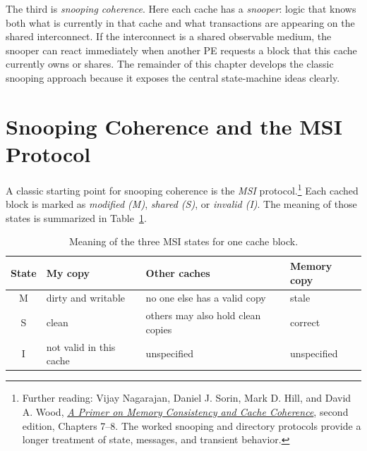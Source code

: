 The third is \textit{snooping coherence}.
Here each cache has a \textit{snooper}: logic that knows both what is currently in that cache and what transactions are appearing on the shared interconnect.
If the interconnect is a shared observable medium, the snooper can react immediately when another PE requests a block that this cache currently owns or shares.
The remainder of this chapter develops the classic snooping approach because it exposes the central state-machine ideas clearly.


\section{Snooping Coherence and the MSI Protocol}\label{sec:mp-msi}
A classic starting point for snooping coherence is the \textit{MSI} protocol.\footnote{Further reading: Vijay Nagarajan, Daniel J. Sorin, Mark D. Hill, and David A. Wood, \href{https://pages.cs.wisc.edu/~markhill/papers/primer2020_2nd_edition.pdf}{\emph{A Primer on Memory Consistency and Cache Coherence}}, second edition, Chapters 7--8. The worked snooping and directory protocols provide a longer treatment of state, messages, and transient behavior.}
Each cached block is marked as \textit{modified (M)}, \textit{shared (S)}, or \textit{invalid (I)}.
The meaning of those states is summarized in Table~\ref{tab:mp-msi-state-meanings}.
\begin{table}[t]
    \centering
    \renewcommand{\arraystretch}{1.15}
    \begin{tabular}{|c|l|l|l|}
        \hline
        State & My copy                 & Other caches                      & Memory copy \\
        \hline
        M     & dirty and writable      & no one else has a valid copy      & stale       \\
        \hline
        S     & clean                   & others may also hold clean copies & correct     \\
        \hline
        I     & not valid in this cache & unspecified                       & unspecified \\
        \hline
    \end{tabular}
    \caption{Meaning of the three MSI states for one cache block.}
    \label{tab:mp-msi-state-meanings}
\end{table}

